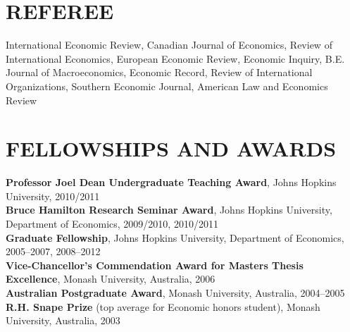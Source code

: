 \documentclass[11pt]{res}
\begin{document}
\begin{resume}
\section{REFEREE} \vspace{3mm}

International Economic Review, Canadian Journal of Economics, Review of International Economics, European Economic Review, Economic Inquiry, B.E. Journal of Macroeconomics, Economic Record, Review of International Organizations, Southern Economic Journal, American Law and Economics Review\\


\phantom{.}\vspace{.4cm}

\section{FELLOWSHIPS AND AWARDS}\vspace{2mm}
{\bf Professor Joel Dean Undergraduate Teaching Award}, Johns Hopkins University, 2010/2011\vspace{1.5mm}\\
{\bf Bruce Hamilton Research Seminar Award}, Johns Hopkins University, Department of Economics, 2009/2010, 2010/2011\vspace{1.5mm}\\
{\bf Graduate Fellowship}, Johns Hopkins University, Department of Economics, 2005--2007, 2008--2012\vspace{1.5mm}\\
{\bf Vice-Chancellor's Commendation Award for Masters Thesis Excellence}, Monash University, Australia, 2006\vspace{1.5mm}\\
{\bf Australian Postgraduate Award}, Monash University, Australia, 2004--2005\vspace{1.5mm}\\
{\bf R.H. Snape Prize} (top average for Economic honors student), Monash University, Australia, 2003 \\


\end{resume}
\end{document}
